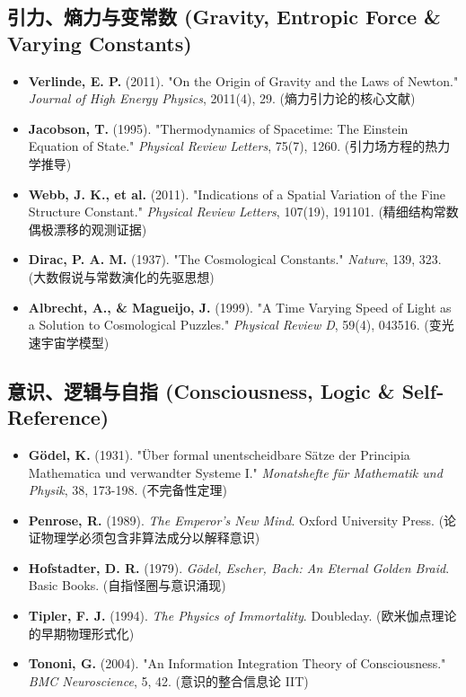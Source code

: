 \subsection{引力、熵力与变常数 (Gravity, Entropic Force \& Varying Constants)}

\begin{itemize}
\item \textbf{Verlinde, E. P.} (2011). "On the Origin of Gravity and the Laws of Newton." \textit{Journal of High Energy Physics}, 2011(4), 29. (熵力引力论的核心文献)
\item \textbf{Jacobson, T.} (1995). "Thermodynamics of Spacetime: The Einstein Equation of State." \textit{Physical Review Letters}, 75(7), 1260. (引力场方程的热力学推导)
\item \textbf{Webb, J. K., et al.} (2011). "Indications of a Spatial Variation of the Fine Structure Constant." \textit{Physical Review Letters}, 107(19), 191101. (精细结构常数偶极漂移的观测证据)
\item \textbf{Dirac, P. A. M.} (1937). "The Cosmological Constants." \textit{Nature}, 139, 323. (大数假说与常数演化的先驱思想)
\item \textbf{Albrecht, A., \& Magueijo, J.} (1999). "A Time Varying Speed of Light as a Solution to Cosmological Puzzles." \textit{Physical Review D}, 59(4), 043516. (变光速宇宙学模型)
\end{itemize}

\subsection{意识、逻辑与自指 (Consciousness, Logic \& Self-Reference)}

\begin{itemize}
\item \textbf{Gödel, K.} (1931). "Über formal unentscheidbare Sätze der Principia Mathematica und verwandter Systeme I." \textit{Monatshefte für Mathematik und Physik}, 38, 173-198. (不完备性定理)
\item \textbf{Penrose, R.} (1989). \textit{The Emperor's New Mind}. Oxford University Press. (论证物理学必须包含非算法成分以解释意识)
\item \textbf{Hofstadter, D. R.} (1979). \textit{Gödel, Escher, Bach: An Eternal Golden Braid}. Basic Books. (自指怪圈与意识涌现)
\item \textbf{Tipler, F. J.} (1994). \textit{The Physics of Immortality}. Doubleday. (欧米伽点理论的早期物理形式化)
\item \textbf{Tononi, G.} (2004). "An Information Integration Theory of Consciousness." \textit{BMC Neuroscience}, 5, 42. (意识的整合信息论 IIT)
\end{itemize}

